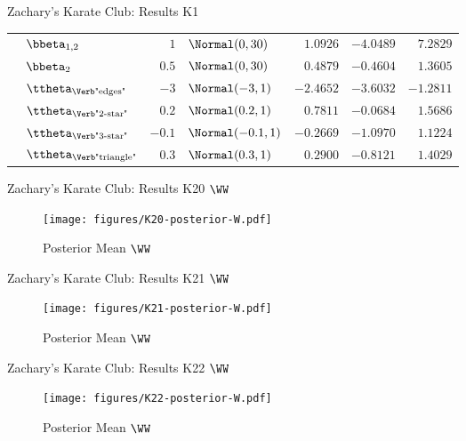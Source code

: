 \documentclass{beamer}
\begin{document}
\begin{frame}{Zachary's Karate Club: Results K1}
\begin{center}
\begin{tabular}{cl|rlrrr}
			& $\bbeta_{1,2}$                     & $1$    & $\Normal(0,30)$      & $1.0926$  & $-4.0489$ & $7.2829$   \\
			& $\bbeta_{2}$                       & $0.5$  & $\Normal(0,30)$      & $0.4879$  & $-0.4604$ & $1.3605$   \\
			& $\ttheta_{\text{\Verb"edges"}}$    & $-3$   & $\Normal(-3,1)$      & $-2.4652$ & $-3.6032$ & $-1.2811$  \\
			& $\ttheta_{\text{\Verb"2-star"}}$   & $0.2$  & $\Normal(0.2,1)$     & $0.7811$  & $-0.0684$ & $1.5686$   \\
			& $\ttheta_{\text{\Verb"3-star"}}$   & $-0.1$ & $\Normal(-0.1,1)$    & $-0.2669$ & $-1.0970$ & $1.1224$   \\
			& $\ttheta_{\text{\Verb"triangle"}}$ & $0.3$  & $\Normal(0.3,1)$     & $0.2900$  & $-0.8121$ & $1.4029$   \\
			\bottomrule
		\end{tabular}
	\end{center}
\end{frame}

\begin{frame}{Zachary's Karate Club: Results K20 $\WW$}
	\begin{figure}[H]
		\centering
		\texttt{[image: figures/K20-posterior-W.pdf]}
		\caption{Posterior Mean $\WW$}
	\end{figure}
\end{frame}

\begin{frame}{Zachary's Karate Club: Results K21 $\WW$}
	\begin{figure}[H]
		\centering
		\texttt{[image: figures/K21-posterior-W.pdf]}
		\caption{Posterior Mean $\WW$}
	\end{figure}
\end{frame}

\begin{frame}{Zachary's Karate Club: Results K22 $\WW$}
	\begin{figure}[H]
		\centering
		\texttt{[image: figures/K22-posterior-W.pdf]}
		\caption{Posterior Mean $\WW$}
	\end{figure}
\end{frame}
\end{document}
